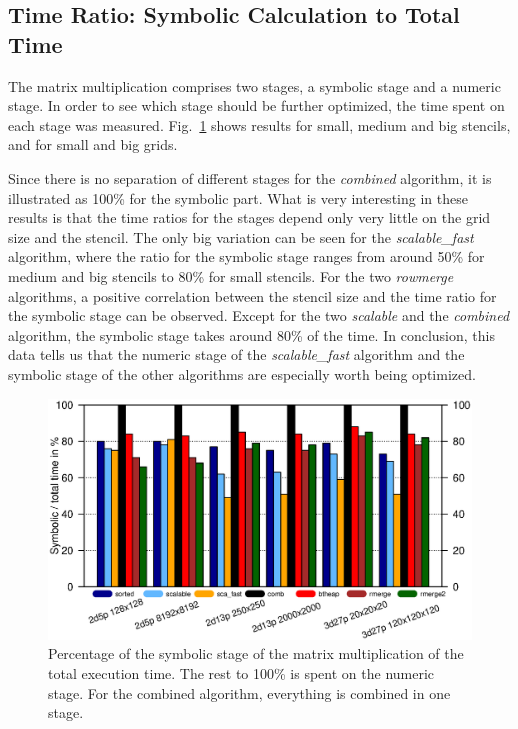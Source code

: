 \subsection{Time Ratio: Symbolic Calculation to Total Time}
The matrix multiplication comprises two stages, a symbolic stage and a numeric stage. In order to see which stage should be further optimized, the time spent on each stage was measured. Fig.~\ref{fig:seqsymnum} shows results for small, medium and big stencils, and for small and big grids. 

Since there is no separation of different stages for the \textit{combined} algorithm, it is illustrated as 100\% for the symbolic part. What is very interesting in these results is that the time ratios for the stages depend only very little on the grid size and the stencil. The only big variation can be seen for the \textit{scalable\_fast} algorithm, where the ratio for the symbolic stage ranges from around 50\% for medium and big stencils to 80\% for small stencils. For the two \textit{rowmerge} algorithms, a positive correlation between the stencil size and the time ratio for the symbolic stage can be observed. Except for the two \textit{scalable} and the \textit{combined} algorithm, the symbolic stage takes around 80\% of the time. In conclusion, this data tells us that the numeric stage of the \textit{scalable\_fast} algorithm and the symbolic stage of the other algorithms are especially worth being optimized.

\begin{figure}[tbp]
	\centering
	\includegraphics[width=1.05\textwidth, trim={0 2.cm 0 6cm},clip]{seq_symnum}
	\caption{Percentage of the symbolic stage of the matrix multiplication of the total execution time. The rest to 100\% is spent on the numeric stage. For the combined algorithm, everything is combined in one stage.} 
	\label{fig:seqsymnum}
\end{figure}


